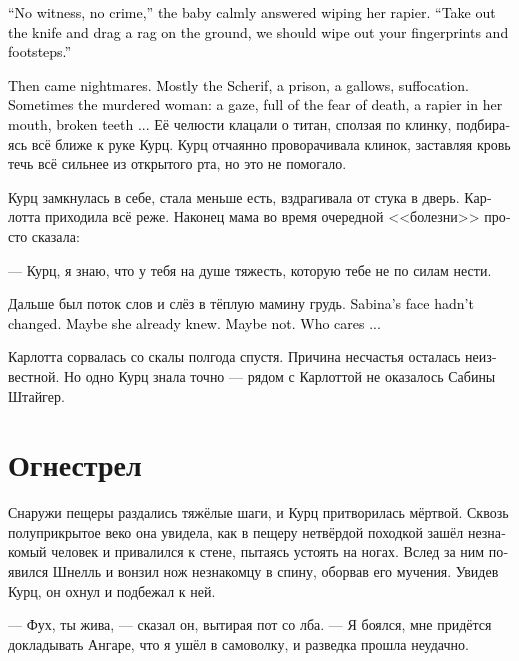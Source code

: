 \documentclass[a4paper,12pt,fleqn]{book}\usepackage{cooltooltips}\usepackage{polyglossia}\setdefaultlanguage[babelshorthands=true]{russian}\setotherlanguage{english}\defaultfontfeatures{Ligatures=TeX,Mapping=tex-text} \usepackage{xcolor}\definecolor{lightgray}{HTML}{bbbbbb}\color{lightgray}\newcommand{\ml}[3]{\textenglish{\textcolor{black}{#3}}}
\begin{document}
\ml{$0$}
{--- Нет свидетелей --- нет преступления, --- спокойно заявил ребёнок, вытирая рапиру.}
{``No witness, no crime,'' the baby calmly answered wiping her rapier.}
\ml{$0$}
{--- Нож вытащи и по земле потаскай тряпку, надо избавиться от твоих отпечатков и следов.}
{``Take out the knife and drag a rag on the ground, we should wipe out your fingerprints and footsteps.''}

\ml{$0$}
{Потом были кошмары.}
{Then came nightmares.}
\ml{$0$}
{В основном шериф, тюрьма, виселица, ощущение нехватки воздуха.}
{Mostly the Scherif, a prison, a gallows, suffocation.}
\ml{$0$}
{Иногда снилась убитая --- полный ужаса взгляд умирающего, торчащая изо рта рапира, выбитые зубы...}
{Sometimes the murdered woman: a gaze, full of the fear of death, a rapier in her mouth, broken teeth ...}
Её челюсти клацали о титан, сползая по клинку, подбираясь всё ближе к руке Курц.
Курц отчаянно проворачивала клинок, заставляя кровь течь всё сильнее из открытого рта, но это не помогало.

Курц замкнулась в себе, стала меньше есть, вздрагивала от стука в дверь.
Карлотта приходила всё реже.
Наконец мама во время очередной <<болезни>> просто сказала:

--- Курц, я знаю, что у тебя на душе тяжесть, которую тебе не по силам нести.

Дальше был поток слов и слёз в тёплую мамину грудь.
\ml{$0$}
{Сабина не изменилась в лице.}
{Sabina's face hadn't changed.}
\ml{$0$}
{Может, она уже знала.}
{Maybe she already knew.}
\ml{$0$}
{А может, и нет.}
{Maybe not.}
\ml{$0$}
{Какая разница...}
{Who cares ...}

Карлотта сорвалась со скалы полгода спустя.
Причина несчастья осталась неизвестной.
Но одно Курц знала точно --- рядом с Карлоттой не оказалось Сабины Штайгер.

\section{Огнестрел}

Снаружи пещеры раздались тяжёлые шаги, и Курц притворилась мёртвой.
Сквозь полуприкрытое веко она увидела, как в пещеру нетвёрдой походкой зашёл незнакомый человек и привалился к стене, пытаясь устоять на ногах.
Вслед за ним появился Шнелль и вонзил нож незнакомцу в спину, оборвав его мучения.
Увидев Курц, он охнул и подбежал к ней.

--- Фух, ты жива, --- сказал он, вытирая пот со лба.
--- Я боялся, мне придётся докладывать Ангаре, что я ушёл в самоволку, и разведка прошла неудачно.
\end{document}
